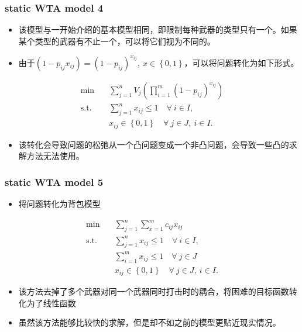 \documentclass[CJK,10pt]{beamer}
\begin{document}
\begin{frame}
    \frametitle{static WTA model 4}
    \begin{itemize}
        \item 该模型与一开始介绍的基本模型相同，即限制每种武器的类型只有一个。如果某个类型的武器有不止一个，可以将它们视为不同的。
        \item 由于$(1-p_{ij}x_{ij}) = (1-p_{ij})^{x_{ij}},~ x \in \left\{ 0,1\right\}$，可以将问题转化为如下形式。
    \end{itemize}
    \begin{align*} \tag{S4}
        \min\quad & \sum_{j=1}^n V_j \left( \prod_{i=1}^m (1 -  p_{ij})^{x_{ij}} \right) \\ 
        \mathrm{s. t.}\quad &\sum_{j=1}^n x_{ij} \leq 1\quad \forall ~i \in I,\\
        & x_{ij} \in \left\{ 0,1 \right\} \quad \forall~ j\in J , ~ i \in I.
    \end{align*}
    \begin{itemize}
        \item 该转化会导致问题的松弛从一个凸问题变成一个非凸问题，会导致一些凸的求解方法无法使用。
    \end{itemize}
\end{frame}

\begin{frame}
    \frametitle{static WTA model 5}
    \begin{itemize}
        \item 将问题转化为背包模型
    \end{itemize}
    \begin{align*} \tag{S5}
        \min\quad & \sum_{j=1}^n{\sum_{x=1}^m{c_{ij}x_{ij}}} \\ 
        \mathrm{s. t.}\quad &\sum_{j=1}^n x_{ij} \leq 1\quad \forall ~i \in I,\\
        & \sum_{i=1}^m x_{ij} \leq 1\quad \forall ~j \in J \\
        & x_{ij} \in \left\{ 0,1 \right\} \quad \forall~ j\in J , ~ i \in I.
    \end{align*}
    \begin{itemize}
        \item 该方法去掉了多个武器对同一个武器同时打击时的耦合，将困难的目标函数转化为了线性函数
        \item 虽然该方法能够比较快的求解，但是却不如之前的模型更贴近现实情况。
    \end{itemize}
\end{frame}
\end{document}
